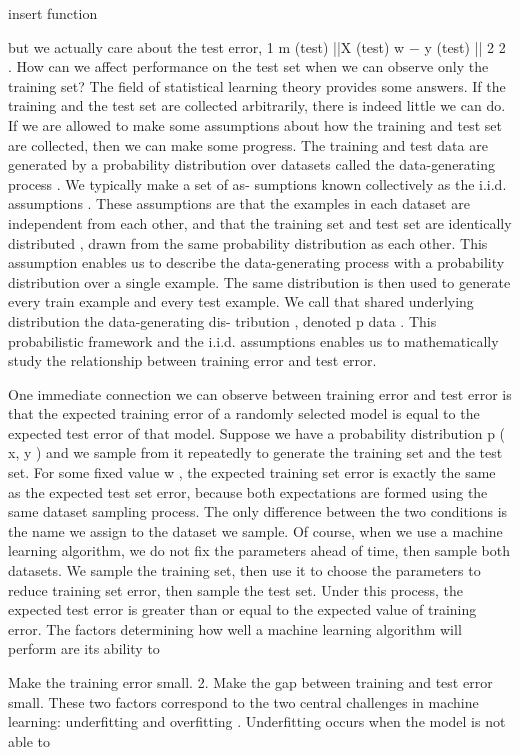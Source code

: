 \documentclass[11pt]{article}
\begin{document}
    insert function

but we actually care about the test error,
1
m
(test)
||X
(test)
w − y
(test)
||
2
2
.
How can we aﬀect performance on the test set when we can observe only the
training set? The ﬁeld of
statistical learning theory
provides some answers. If
the training and the test set are collected arbitrarily, there is indeed little we can
do. If we are allowed to make some assumptions about how the training and test
set are collected, then we can make some progress.
The training and test data are generated by a probability distribution over
datasets called the
data-generating process
. We typically make a set of as-
sumptions known collectively as the
i.i.d. assumptions
. These assumptions are
that the examples in each dataset are
independent
from each other, and that
the training set and test set are
identically distributed
, drawn from the same
probability distribution as each other. This assumption enables us to describe
the data-generating process with a probability distribution over a single example.
The same distribution is then used to generate every train example and every test
example. We call that shared underlying distribution the
data-generating dis-
tribution
, denoted
p
data
. This probabilistic framework and the i.i.d. assumptions
enables us to mathematically study the relationship between training error and
test error.

One immediate connection we can observe between training error and test error
is that the expected training error of a randomly selected model is equal to the
expected test error of that model. Suppose we have a probability distribution
p
(
x, y
) and we sample from it repeatedly to generate the training set and the test
set. For some ﬁxed value
w
, the expected training set error is exactly the same as
the expected test set error, because both expectations are formed using the same
dataset sampling process. The only diﬀerence between the two conditions is the
name we assign to the dataset we sample.
Of course, when we use a machine learning algorithm, we do not ﬁx the
parameters ahead of time, then sample both datasets. We sample the training set,
then use it to choose the parameters to reduce training set error, then sample the
test set. Under this process, the expected test error is greater than or equal to
the expected value of training error. The factors determining how well a machine
learning algorithm will perform are its ability to

Make the training error small.
2. Make the gap between training and test error small.
These two factors correspond to the two central challenges in machine learning:
underﬁtting
and
overﬁtting
. Underﬁtting occurs when the model is not able to
\end{document}
